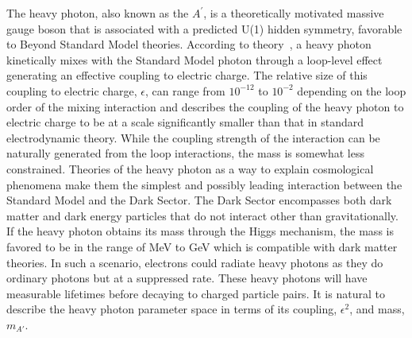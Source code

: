 The heavy photon, also known as the $A^{\prime}$, is a theoretically motivated massive gauge boson that is associated with a predicted U(1) hidden symmetry, favorable to Beyond Standard Model theories. According to theory~\cite{holdom_two_1986}, a heavy photon kinetically mixes with the Standard Model photon through a loop-level effect generating an effective coupling to electric charge. The relative size of this coupling to electric charge, $\epsilon$, can range from $10^{-12}$ to $10^{-2}$ depending on the loop order of the mixing interaction and describes the coupling of the heavy photon to electric charge to be at a scale significantly smaller than that in standard electrodynamic theory. While the coupling strength of the interaction can be naturally generated from the loop interactions, the mass is somewhat less constrained. Theories of the heavy photon as a way to explain cosmological phenomena make them the simplest and possibly leading interaction between the Standard Model and the Dark Sector. The Dark Sector encompasses both dark matter and dark energy particles that do not interact other than gravitationally. If the heavy photon obtains its mass through the Higgs mechanism, the mass is favored to be in the range of MeV to GeV which is compatible with dark matter theories. In such a scenario, electrons could radiate heavy photons as they do ordinary photons but at a suppressed rate. These heavy photons will have measurable lifetimes before decaying to charged particle pairs. It is natural to describe the heavy photon parameter space in terms of its coupling, $\epsilon^2$, and mass, $m_{A'}$.\\
